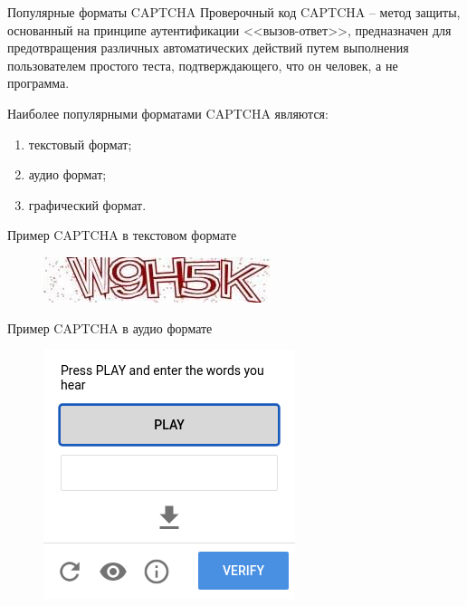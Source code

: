 \documentclass[12pt,a4paper,mathserif]{beamer}
\begin{document}
\begin{frame}{Популярные форматы CAPTCHA}
    \setlength{\parindent}{0.5cm}
    Проверочный код CAPTCHA -- метод защиты, основанный на принципе 
    аутентификации <<вызов-ответ>>, предназначен для предотвращения различных 
    автоматических действий путем выполнения пользователем простого теста, 
    подтверждающего, что он человек, а не программа.

    Наиболее популярными форматами CAPTCHA являются:

    \begin{enumerate}
        \item текстовый формат;
        \item аудио формат;
        \item графический формат.
    \end{enumerate}
\end{frame}

\begin{frame}{Пример CAPTCHA в текстовом формате}
    \begin{figure}
        \centering
        \includegraphics[width=1\linewidth]{imgs/text-captcha.jpg}
    \end{figure}
\end{frame}

\begin{frame}{Пример CAPTCHA в аудио формате}
    \begin{figure}
        \centering
        \includegraphics[width=0.55\linewidth]{imgs/audio-captcha.png}
    \end{figure}
\end{frame}
\end{document}
